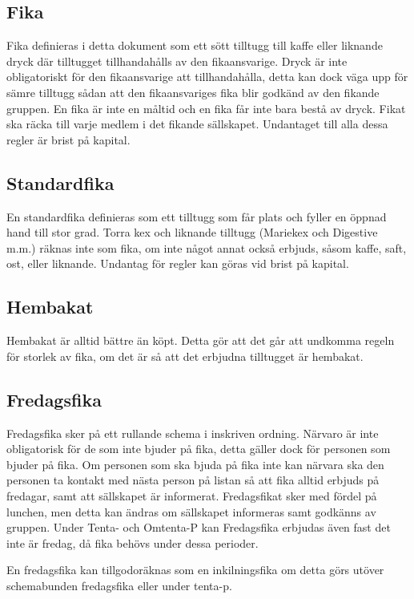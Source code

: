 \documentclass{article}
\begin{document}
\subsection{Fika} \label{fikafika}
Fika definieras i detta dokument som ett sött tilltugg till kaffe eller liknande
dryck där tilltugget tillhandahålls av den fikaansvarige. Dryck är inte
obligatoriskt för den fikaansvarige att tillhandahålla, detta kan dock väga upp
för sämre tilltugg sådan att den fikaansvariges fika blir godkänd av den fikande
gruppen. En fika är inte en måltid och en fika får inte bara bestå av dryck.
Fikat ska räcka till varje medlem i det fikande sällskapet. Undantaget till alla
dessa regler är brist på kapital.

\subsection{Standardfika} \label{fikastandard}
En standardfika definieras som ett tilltugg som får plats och fyller en öppnad
hand till stor grad. Torra kex och liknande tilltugg (Mariekex och Digestive
m.m.) räknas inte som fika, om inte något annat också erbjuds, såsom kaffe,
saft, ost, eller liknande. Undantag för regler kan göras vid brist på kapital.

\subsection{Hembakat}
Hembakat är alltid bättre än köpt. Detta gör att det går att undkomma regeln för
storlek av fika, om det är så att det erbjudna tilltugget är hembakat.

\subsection{Fredagsfika} \label{fredagsfika}
Fredagsfika sker på ett rullande schema i inskriven ordning. Närvaro är inte
obligatorisk för de som inte bjuder på fika, detta gäller dock för personen som
bjuder på fika. Om personen som ska bjuda på fika inte kan närvara ska den
personen ta kontakt med nästa person på listan så att fika alltid erbjuds på
fredagar, samt att sällskapet är informerat. Fredagsfikat sker med fördel på
lunchen, men detta kan ändras om sällskapet informeras samt godkänns av gruppen.
Under Tenta- och Omtenta-P kan Fredagsfika erbjudas även fast det inte är
fredag, då fika behövs under dessa perioder.

En fredagsfika kan tillgodoräknas som en inkilningsfika om detta görs utöver
schemabunden fredagsfika eller under tenta-p.
\end{document}
